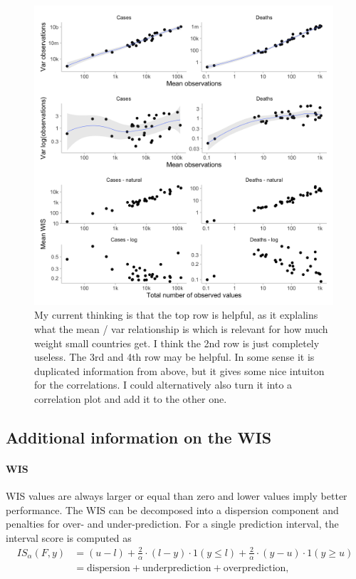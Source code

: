 \documentclass{article}
\begin{document}
\begin{figure}[h!]
    \centering
    \includegraphics[width=0.99\textwidth]{output/figures/HUB-mean-scores-vs-total-log-log.png}
    \caption{My current thinking is that the top row is helpful, as it explalins what the mean / var relationship is which is relevant for how much weight small countries get. I think the 2nd row is just completely useless. The 3rd and 4th row may be helpful. In some sense it is duplicated information from above, but it gives some nice intuiton for the correlations. I could alternatively also turn it into a correlation plot and add it to the other one. }
    \label{fig:HUB-mean-scores-total-loglog}
\end{figure}


\subsection{Additional information on the WIS} \label{wis}
\paragraph{WIS}

WIS values are always larger or equal than zero and lower values imply better performance. The WIS can be decomposed into a dispersion component and penalties for over- and under-prediction. For a single prediction interval, the interval score is computed as 
\begin{align}
 IS_\alpha(F,y) &= (u-l) + \frac{2}{\alpha} \cdot (l-y) \cdot 1(y \leq l) + \frac{2}{\alpha} \cdot (y-u) \cdot 1(y \geq u) \\
 &= \text{dispersion} + \text{underprediction} + \text{overprediction},    
\end{align}
\end{document}
